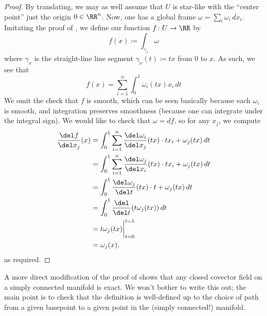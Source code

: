 \documentclass[../notes.tex]{subfiles}
\begin{document}
\begin{proof}
	By translating, we may as well assume that $U$ is star-like with the ``center point'' just the origin $0\in\RR^n$. Now, one has a global frame $\omega=\sum_i\omega_i\,dx_i$. Imitating the proof of , we define our function $f\colon U\to\RR$ by
	\[f(x)\coloneqq\int_{\gamma_x}\omega\]
	where $\gamma_x$ is the straight-line line segment $\gamma_x(t)\coloneqq tx$ from $0$ to $x$. As such, we see that
	\[f(x)=\sum_{i=1}^n\int_0^1\omega_i(tx)x_i\,dt\]
	We omit the check that $f$ is smooth, which can be seen basically because each $\omega_i$ is smooth, and integration preserves smoothness (because one can integrate under the integral sign). We would like to check that $\omega=df$, so for any $x_j$, we compute
	\begin{align*}
		\frac{\del f}{\del x_j}(x) &= \int_0^1\sum_{i=1}^n\frac{\del\omega_i}{\del x_j}(tx)\cdot tx_i+\omega_j(tx)\,dt \\
		&= \int_0^1\sum_{i=1}^n\frac{\del\omega_j}{\del x_i}(tx)\cdot tx_i+\omega_j(tx)\,dt \\
		&= \int_0^1\frac{\del\omega_j}{\del t}(tx)\cdot t+\omega_j(tx)\,dt \\
		&= \int_0^1\frac{\del}{\del t}(t\omega_j(tx))\,dt \\
		&= t\omega_j(tx)\bigg|_{t=0}^{t=1} \\
		&= \omega_j(x),
	\end{align*}
	as required.
\end{proof}
\begin{remark}
	A more direct modification of the proof of  shows that any closed covector field on a simply connected manifold is exact. We won't bother to write this out; the main point is to check that the definition is well-defined up to the choice of path from a given basepoint to a given point in the (simply connected!) manifold.
\end{remark}
\end{document}
